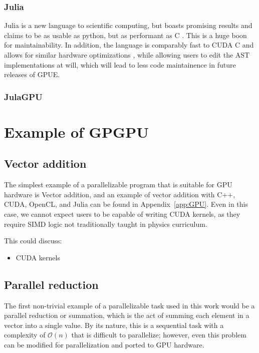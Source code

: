 \subsubsection{Julia}
Julia is a new language to scientific computing, but boasts promising results and claims to be as usable as python, but as performant as C .
This is a huge boon for maintainability.
In addition, the language is comparably fast to CUDA C and allows for similar hardware optimizations \cite{besard2016, besard2018}, while allowing users to edit the AST implementations at will, which will lead to less code maintainence in future releases of GPUE.


\subsubsection{JulaGPU}

\section{Example of GPGPU}

\subsection{Vector addition}
The simplest example of a parallelizable program that is suitable for GPU hardware is Vector addition, and an example of vector addition with C++, CUDA, OpenCL, and Julia can be found in Appendix~\ref{app:GPU}.
Even in this case, we cannot expect users to be capable of writing CUDA kernels, as they require SIMD logic not traditionally taught in physics curriculum.

This could discuss:
\begin{itemize}
\item CUDA kernels
\end{itemize}

\subsection{Parallel reduction}
The first non-trivial example of a parallelizable task used in this work would be a parallel reduction or summation, which is the act of summing each element in a vector into a single value.
By its nature, this is a sequential task with a complexity of $\mathcal{O}(n)$ that is difficult to parallelize; however, even this problem can be modified for parallelization and ported to GPU hardware.
